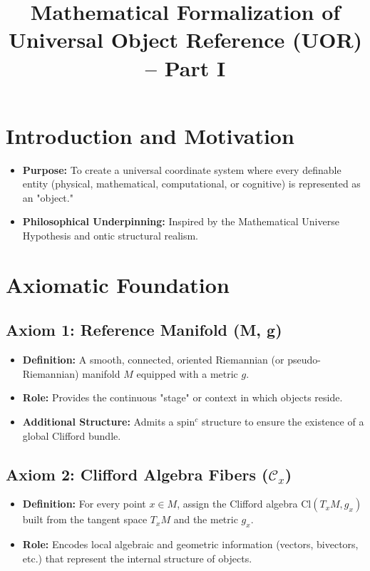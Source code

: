 \documentclass[12pt]{article}
\title{Mathematical Formalization of Universal Object Reference (UOR) -- Part I}
\author{}
\date{}
\begin{document}
\maketitle

\section{Introduction and Motivation}
\begin{itemize}
    \item \textbf{Purpose:} To create a universal coordinate system where every definable entity (physical, mathematical, computational, or cognitive) is represented as an "object."
    \item \textbf{Philosophical Underpinning:} Inspired by the Mathematical Universe Hypothesis and ontic structural realism.
\end{itemize}

\section{Axiomatic Foundation}

\subsection{Axiom 1: Reference Manifold (M, g)}
\begin{itemize}
    \item \textbf{Definition:} A smooth, connected, oriented Riemannian (or pseudo-Riemannian) manifold \( M \) equipped with a metric \( g \).
    \item \textbf{Role:} Provides the continuous "stage" or context in which objects reside.
    \item \textbf{Additional Structure:} Admits a \( \text{spin}^c \) structure to ensure the existence of a global Clifford bundle.
\end{itemize}

\subsection{Axiom 2: Clifford Algebra Fibers (\(\mathcal{C}_x\))}
\begin{itemize}
    \item \textbf{Definition:} For every point \( x \in M \), assign the Clifford algebra \( \mathrm{Cl}(T_x M, g_x) \) built from the tangent space \( T_x M \) and the metric \( g_x \).
    \item \textbf{Role:} Encodes local algebraic and geometric information (vectors, bivectors, etc.) that represent the internal structure of objects.
\end{itemize}
\end{document}
